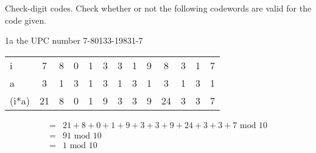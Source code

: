 \begin{question}{1}
Check-digit codes. Check whether or not the following codewords are valid for the
code given.
\end{question}


\begin{question}{1a}
the UPC number 7-80133-19831-7


\begin{tabular}{l|cccccccccccc}
\hline
i     & 7  & 8 & 0 & 1 & 3 & 3 & 1 & 9 & 8 & 3 & 1 & 7 \\
a     & 3  & 1 & 3 & 1 & 3 & 1 & 3 & 1 & 3 & 1 & 3 & 1\\
\hline
(i*a) & 21 & 8 & 0 & 1 & 9 & 3 & 3 & 9 & 24 & 3 & 3 & 7
\end{tabular}

\begin{align*}
=&21 + 8 + 0 + 1 + 9 + 3 + 3 + 9 + 24 + 3 + 3 + 7\textrm{ mod } 10\\
=&91 \textrm{ mod } 10\\
=&1 \textrm{ mod } 10\\
\end{align*}
\end{question}


